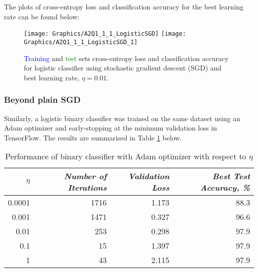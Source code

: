 \documentclass[a4paper,12pt]{article}
\begin{document}
The plots of cross-entropy loss and classification accuracy for the best learning rate can be found below:

\begin{figure}[!htb]
\centering
\texttt{[image: Graphics/A2Q1\_1\_1\_LogisticSGD]}
\texttt{[image: Graphics/A2Q1\_1\_1\_LogisticSGD\_1]}
\caption{\label{figure:LogisticSGD} \textcolor{blue}{Training} and \textcolor{green}{test} sets cross-entropy loss and classification accuracy for logistic classifier using stochastic gradient descent (SGD) and best learning rate, $\eta = 0.01$.}
\end{figure}

\clearpage
\subsubsection{Beyond plain SGD}

Similarly, a logistic binary classifier was trained on the same dataset using an Adam optimizer and early-stopping at the minimum validation loss in TensorFlow. The results are summarised in Table \ref{table:TuneLearningRateAdam} below.

\begin{table}[!htb]
\centering
\caption{Performance of binary classifier with Adam optimizer with respect to $\eta$}
\label{table:TuneLearningRateAdam}
\vspace{0.5em}
\begin{tabular}{|r|r r r|} \hline
$\eta$ & \textit{Number of Iterations} & \textit{Validation Loss} & \textit{Best Test Accuracy, \%} \\ \hline
0.0001 & 1716 & 1.173 & 88.3 \\
0.001 & 1471 & 0.327 & 96.6 \\
0.01 & 253 & 0.298 & 97.9 \\
0.1 & 15 & 1.397 & 97.9 \\
1 & 43 & 2.115 & 97.9 \\
\hline
\end{tabular}
\end{table}
\end{document}
